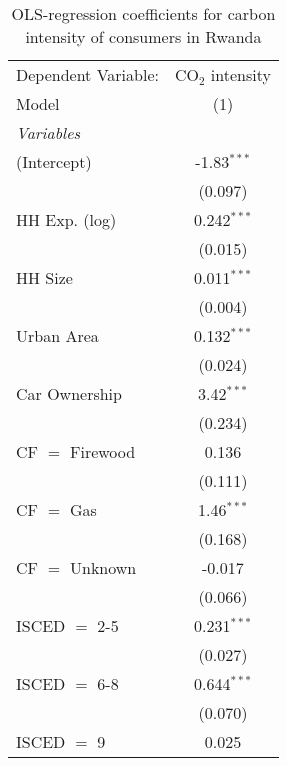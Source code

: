 
\begin{table}[htbp!]
   \centering
   \small
   \begin{adjustbox}{width = 1\textwidth, max height = 0.95\textheight, center}
      \begin{threeparttable}[b]
         \caption{\label{tab:OLS_1_RWA} OLS-regression coefficients for carbon intensity of consumers in Rwanda}
         \begin{tabular}{lc}
            \tabularnewline \midrule \midrule
            Dependent Variable: & CO$_{2}$ intensity\\  
            Model               & (1)\\  
            \midrule
            \emph{Variables}\\
            (Intercept)         & -1.83$^{***}$\\   
                                & (0.097)\\   
            HH Exp. (log)       & 0.242$^{***}$\\   
                                & (0.015)\\   
            HH Size             & 0.011$^{***}$\\   
                                & (0.004)\\   
            Urban Area          & 0.132$^{***}$\\   
                                & (0.024)\\   
            Car Ownership       & 3.42$^{***}$\\   
                                & (0.234)\\   
            CF $=$ Firewood     & 0.136\\   
                                & (0.111)\\   
            CF $=$ Gas          & 1.46$^{***}$\\   
                                & (0.168)\\   
            CF $=$ Unknown      & -0.017\\   
                                & (0.066)\\   
            ISCED $=$ 2-5       & 0.231$^{***}$\\   
                                & (0.027)\\   
            ISCED $=$ 6-8       & 0.644$^{***}$\\   
                                & (0.070)\\   
            ISCED $=$ 9         & 0.025\\   

\end{tabular}
\end{threeparttable}
\end{adjustbox}
\end{table}
